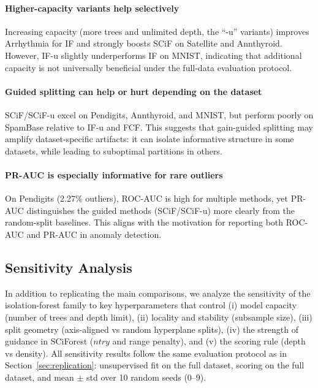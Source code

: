 \paragraph{Higher-capacity variants help selectively}
Increasing capacity (more trees and unlimited depth, the ``-u'' variants) improves Arrhythmia for IF and strongly boosts SCiF on Satellite and Annthyroid.
However, IF-u slightly underperforms IF on MNIST, indicating that additional capacity is not universally beneficial under the full-data evaluation protocol.

\paragraph{Guided splitting can help or hurt depending on the dataset}
SCiF/SCiF-u excel on Pendigits, Annthyroid, and MNIST, but perform poorly on SpamBase relative to IF-u and FCF.
This suggests that gain-guided splitting may amplify dataset-specific artifacts: it can isolate informative structure in some datasets, while leading to suboptimal partitions in others.

\paragraph{PR-AUC is especially informative for rare outliers}
On Pendigits (2.27\% outliers), ROC-AUC is high for multiple methods, yet PR-AUC distinguishes the guided methods (SCiF/SCiF-u) more clearly from the random-split baselines.
This aligns with the motivation for reporting both ROC-AUC and PR-AUC in anomaly detection.

\subsection{Sensitivity Analysis}
\label{sec:sensitivity}

In addition to replicating the main comparisons, we analyze the sensitivity of the isolation-forest family to key hyperparameters that control (i) model capacity (number of trees and depth limit), (ii) locality and stability (subsample size), (iii) split geometry (axis-aligned vs random hyperplane splits), (iv) the strength of guidance in SCiForest ($ntry$ and range penalty), and (v) the scoring rule (depth vs density).
All sensitivity results follow the same evaluation protocol as in Section~\ref{sec:replication}: unsupervised fit on the full dataset, scoring on the full dataset, and mean $\pm$ std over 10 random seeds (0--9).


